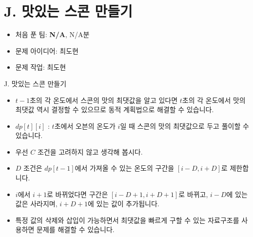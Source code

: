 \def\probno{J}
\def\probtitle{맛있는 스콘 만들기}

\section{\probno{}. \probtitle{}}

\begin{frame} %
    \sectiontitle{\probno{}}{\probtitle{}}
    \begin{itemize}
        \item 처음 푼 팀: \textbf{N/A}, N/A분
        \item 문제 아이디어: 최도현
        \item 문제 작업: 최도현
    \end{itemize}
\end{frame}

\begin{frame}{\probno{}. \probtitle{}}
    \begin{itemize}
        \item $t-1$초의 각 온도에서 스콘의 맛의 최댓값을 알고 있다면 $t$초의 각 온도에서 맛의 최댓값 역시 결정할 수 있으므로 동적 계획법으로 해결할 수 있습니다.
        \item $dp[t][i]$ : $t$초에서 오븐의 온도가 $i$일 때 스콘의 맛의 최댓값으로 두고 풀이할 수 있습니다.
        \vspace{3mm}
        \item 우선 $C$ 조건을 고려하지 않고 생각해 봅시다.
        \item $D$ 조건은 $dp[t-1]$에서 가져올 수 있는 온도의 구간을 $[i-D, i+D]$로 제한합니다.
        \item $i$에서 $i+1$로 바뀌었다면 구간은 $[i-D+1, i+D+1]$로 바뀌고, $i-D$에 있는 값은 사라지며, $i+D+1$에 있는 값이 추가됩니다.
        \item 특정 값의 삭제와 삽입이 가능하면서 최댓값을 빠르게 구할 수 있는 자료구조를 사용하면 문제를 해결할 수 있습니다.
    \end{itemize}
\end{frame}

